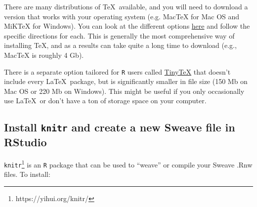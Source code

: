 \documentclass[11pt]{article}\usepackage[]{graphicx}\usepackage[]{color}
\begin{document}
There are many distributions of \TeX\ available, and you will need to download a version that works with your operating system (e.g. MacTeX for Mac OS and MiKTeX for Windows). You can look at the different options \href{https://www.latex-project.org/get/}{here} and follow the specific directions for each. This is generally the most comprehensive way of installing \TeX, and as a results can take quite a long time to download (e.g., MacTeX is roughly 4 Gb). 

There is a separate option tailored for \texttt{R} users called \href{https://yihui.org/tinytex/}{TinyTeX} that doesn't include every \LaTeX\ package, but is significantly smaller in file size (150 Mb on Mac OS or 220 Mb on Windows). This might be useful if you only occasionally use \LaTeX\ or don't have a ton of storage space on your computer. 


\subsection{Install \texttt{knitr} and create a new Sweave file in RStudio}

\texttt{knitr}\footnote{https://yihui.org/knitr/} is an \texttt{R} package that can be used to ``weave'' or compile your Sweave .Rnw files. To install:
\end{document}
